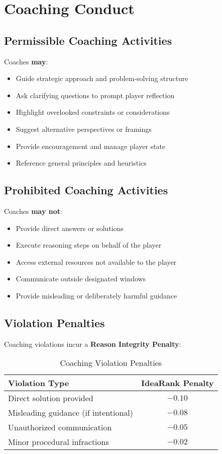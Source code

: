 \section{Coaching Conduct}

\subsection{Permissible Coaching Activities}

Coaches \textbf{may}:
\begin{itemize}[leftmargin=*]
  \item Guide strategic approach and problem-solving structure
  \item Ask clarifying questions to prompt player reflection
  \item Highlight overlooked constraints or considerations
  \item Suggest alternative perspectives or framings
  \item Provide encouragement and manage player state
  \item Reference general principles and heuristics
\end{itemize}

\subsection{Prohibited Coaching Activities}

Coaches \textbf{may not}:
\begin{itemize}[leftmargin=*]
  \item Provide direct answers or solutions
  \item Execute reasoning steps on behalf of the player
  \item Access external resources not available to the player
  \item Communicate outside designated windows
  \item Provide misleading or deliberately harmful guidance
\end{itemize}

\subsection{Violation Penalties}

Coaching violations incur a \textbf{Reason Integrity Penalty}:

\begin{table}[h]
\centering
\begin{tabular}{@{}lc@{}}
\toprule
\textbf{Violation Type} & \textbf{IdeaRank Penalty} \\ \midrule
Direct solution provided & $-0.10$ \\
Misleading guidance (if intentional) & $-0.08$ \\
Unauthorized communication & $-0.05$ \\
Minor procedural infractions & $-0.02$ \\ \bottomrule
\end{tabular}
\caption{Coaching Violation Penalties}
\label{tab:coaching_penalties}
\end{table}

